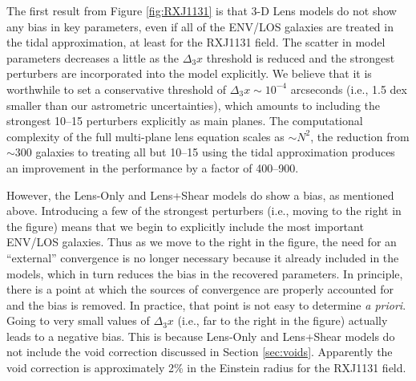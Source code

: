\documentclass{emulateapj}
\begin{document}
The first result from Figure \ref{fig:RXJ1131} is that 3-D Lens models do not show any bias in key parameters, even if all of the ENV/LOS galaxies are treated in the tidal approximation, at least for the RXJ1131 field. The scatter in model parameters decreases a little as the $\Delta_3 x$ threshold is reduced and the strongest perturbers are incorporated into the model explicitly.  We believe that it is worthwhile to set a conservative threshold of $\Delta_3 x \sim 10^{-4}$ arcseconds (i.e., 1.5 dex smaller than our astrometric uncertainties), which amounts to including the strongest 10--15 perturbers explicitly as main planes. The computational complexity of the full multi-plane lens equation scales as $\sim N^2$, the reduction from $\sim 300$ galaxies to treating all but 10--15 using the tidal approximation produces an improvement in the performance by a factor of 400--900.

However, the Lens-Only and Lens+Shear models do show a bias, as mentioned above. Introducing a few of the strongest perturbers (i.e., moving to the right in the figure) means that we begin to explicitly include the most important ENV/LOS galaxies. Thus as we move to the right in the figure, the need for an ``external'' convergence is no longer necessary because it already included in the models, which in turn reduces the bias in the recovered parameters.  In principle, there is a point at which the sources of convergence are properly accounted for and the bias is removed.  In practice, that point is not easy to determine \emph{a priori}.  Going to very small values of $\Delta_3 x$ (i.e., far to the right in the figure) actually leads to a negative bias.  This is because Lens-Only and Lens+Shear models do not include the void correction discussed in Section \ref{sec:voids}.  Apparently the void correction is approximately 2\% in the Einstein radius for the RXJ1131 field.
\end{document}
